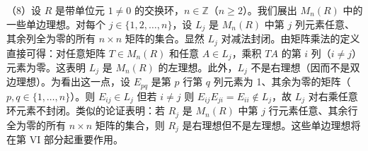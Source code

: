 \begin{example}
（8）设 \(R\) 是带单位元 \(1 \neq 0\) 的交换环，\(n \in \mathbb{Z}\)（\(n \geq 2\)）。我们展出 \(M_n(R)\) 中的一些单边理想。对每个 \(j \in \{1, 2, \ldots, n\}\)，设 \(L_j\) 是 \(M_n(R)\) 中第 \(j\) 列元素任意、其余列全为零的所有 \(n \times n\) 矩阵的集合。显然 \(L_j\) 对减法封闭。由矩阵乘法的定义直接可得：对任意矩阵 \(T \in M_n(R)\) 和任意 \(A \in L_j\)，乘积 \(TA\) 的第 \(i\) 列（\(i \neq j\)）元素为零。这表明 \(L_j\) 是 \(M_n(R)\) 的左理想。此外，\(L_j\) 不是右理想（因而不是双边理想）。为看出这一点，设 \(E_{pq}\) 是第 \(p\) 行第 \(q\) 列元素为 1、其余为零的矩阵（\(p, q \in \{1, \ldots, n\}\)）。则 \(E_{ij} \in L_j\) 但若 \(i \neq j\) 则 \(E_{ij}E_{ji} = E_{ii} \notin L_j\)，故 \(L_j\) 对右乘任意环元素不封闭。类似的论证表明：若 \(R_j\) 是 \(M_n(R)\) 中第 \(j\) 行元素任意、其余行全为零的所有 \(n \times n\) 矩阵的集合，则 \(R_j\) 是右理想但不是左理想。这些单边理想将在第 VI 部分起重要作用。
\end{example}

